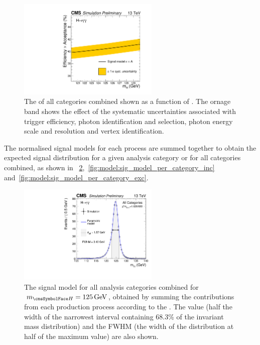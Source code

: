 \begin{figure}[ht!]
\centering
\includegraphics[width=0.6\textwidth]{modellingFigures/effAcc_vs_mass.pdf} 
\caption{The \effxacc of all categories combined shown as a function of \mH. The ornage band shows the effect of the systematic uncertainties associated with trigger efficiency, photon identification and selection, photon energy scale and resolution and vertex identification.}

\label{fig:model:sig_effxacc}
\end{figure}

The normalised signal models for each process are summed together to obtain the expected signal \mgg distribution for a given analysis category or for all categories combined, as shown in \Fig\s~\ref{fig:model:sig_model_all},~\ref{fig:model:sig_model_per_category_inc} and~\ref{fig:model:sig_model_per_category_exc}.
\begin{figure}[ht!]
\centering
\includegraphics[width=0.6\textwidth]{modellingFigures/DCBpG/all.pdf} 

\caption{The signal model for all analysis categories combined for $\mH=125\GeV$, obtained by summing the contributions from each production process according to the \effxacc. The \effSigma value (half the width of the narrowest interval containing 68.3\% of the invariant mass distribution) and the FWHM (the width of the distribution at half of the maximum value) are also shown. }

\label{fig:model:sig_model_all}
\end{figure}


